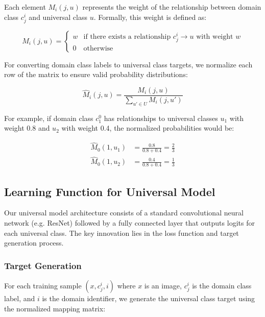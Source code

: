 Each element $M_i(j, u)$ represents the weight of the relationship between domain class $c_j^i$ and universal class $u$.
Formally, this weight is defined as:

\begin{equation}
      M_i(j, u) =
      \begin{cases}
            w & \text{if there exists a relationship } c_j^i \rightarrow u \text{ with weight } w \\
            0 & \text{otherwise}
      \end{cases}
\end{equation}

For converting domain class labels to universal class targets, we normalize each row of the matrix
to ensure valid probability distributions:

\begin{equation}
      \hat{M}_i(j, u) = \frac{M_i(j, u)}{\sum_{u' \in U} M_i(j, u')}
\end{equation}

For example, if domain class $c_1^0$ has relationships to universal classes $u_1$ with weight 0.8
and $u_2$ with weight 0.4, the normalized probabilities would be:

\begin{align*}
      \hat{M}_0(1, u_1) & = \frac{0.8}{0.8 + 0.4} = \frac{2}{3} \\
      \hat{M}_0(1, u_2) & = \frac{0.4}{0.8 + 0.4} = \frac{1}{3}
\end{align*}

\subsection{Learning Function for Universal Model}

Our universal model architecture consists of a standard convolutional neural network
(e.g. ResNet) followed by a fully connected layer that outputs logits for each universal class.
The key innovation lies in the loss function and target generation process.

\subsubsection{Target Generation}

For each training sample $(x, c_j^i, i)$ where $x$ is an image, $c_j^i$ is the domain class label,
and $i$ is the domain identifier, we generate the universal class target using the normalized mapping matrix:


